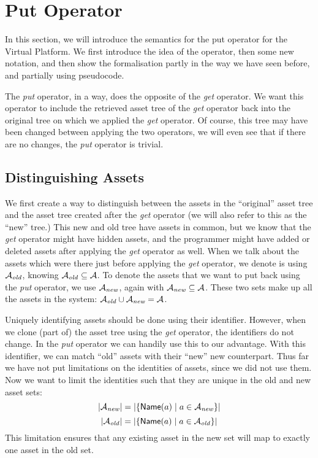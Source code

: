 \section{Put Operator}\label{sec:vp:putoperator}
In this section, we will introduce the semantics for the put operator for the
Virtual Platform. We first introduce the idea of the operator, then some new 
notation, and then show the formalisation partly in the way we have seen 
before, and partially using pseudocode.

The \emph{put} operator, in a way, does the opposite of the \emph{get} 
operator. We want this operator to include the retrieved asset tree of the
\emph{get} operator back into the original tree on which we applied the
\emph{get} operator. Of course, this tree may have been changed between applying
the two operators, we will even see that if there are no changes, the
\emph{put} operator is trivial.

\subsection*{Distinguishing Assets}
We first create a way to distinguish between the assets in the ``original''
asset tree and the asset tree created after the \emph{get} operator (we will
also refer to this as the ``new'' tree.) This new and old tree have assets in
common, but we know that the \emph{get} operator might have hidden assets, and
the programmer might have added or deleted assets after applying the \emph{get}
operator as well. When we talk about the assets which were there just before
applying the \emph{get} operator, we denote is using \(\mathcal{A}_{\it old}\), knowing
\(\mathcal{A}_{\it old} \subseteq \mathcal{A}\). To denote the assets that we want to put
back using the \emph{put} operator, we use \(\mathcal{A}_{\it new}\), again with
\(\mathcal{A}_{\it new} \subseteq \mathcal{A}\). These two sets make up all the assets in
the system: \(\mathcal{A}_{\it old} \cup \mathcal{A}_{\it new} = \mathcal{A}\).

Uniquely identifying assets should be done using their identifier. However,
when we clone (part of) the asset tree using the \emph{get} operator, the
identifiers do not change. In the \emph{put} operator we can handily use this
to our advantage. With this identifier, we can match ``old'' assets with their
``new'' new counterpart. Thus far we have not put limitations on the identities
of assets, since we did not use them. Now we want to limit the identities such
that they are unique in the old and new asset sets:
\[
  \left| \mathcal{A}_{\it new} \right| = \left| \left\{ {\sf Name}(a) \hspace*{1mm}\middle|\hspace*{1mm} a \in \mathcal{A}_{\it new} \right\} \right|
\]
\[
  \left| \mathcal{A}_{\it old} \right| = \left| \left\{ {\sf Name}(a) \hspace*{1mm}\middle|\hspace*{1mm} a \in \mathcal{A}_{\it old} \right\} \right|
\]
This limitation ensures that any existing asset in the new set will map to
exactly one asset in the old set.

